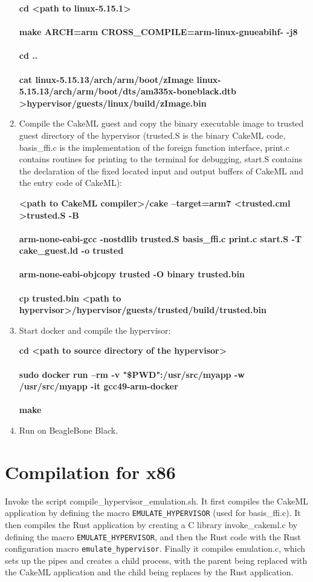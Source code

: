 \documentclass[11pt, a4paper]{article}
\begin{document}
\begin{enumerate}
		\textbf{cd \textless path to linux-5.15.1\textgreater}
\\\\
		\textbf{make ARCH=arm CROSS\_COMPILE=arm-linux-gnueabihf- -j8}
\\\\
		\textbf{cd ..}
\\\\
		\textbf{cat linux-5.15.13/arch/arm/boot/zImage linux-5.15.13/arch/arm/boot/dts/am335x-boneblack.dtb \textgreater hypervisor/guests/linux/build/zImage.bin}

\item
	Compile the CakeML guest and copy the binary executable image to trusted
	guest directory of the hypervisor (trusted.S is the binary CakeML code,
	basis\_ffi.c is the implementation of the foreign function interface, print.c
	contains routines for printing to the terminal for debugging, start.S
	contains the declaration of the fixed located input and output buffers of
	CakeML and the entry code of CakeML):

		\textbf{\textless path to CakeML compiler\textgreater/cake --target=arm7  <trusted.cml >trusted.S -B}
\\\\
		\textbf{arm-none-eabi-gcc -nostdlib trusted.S basis\_ffi.c print.c start.S -T cake\_guest.ld -o trusted}
\\\\
		\textbf{arm-none-eabi-objcopy trusted -O binary trusted.bin}
\\\\
		\textbf{cp trusted.bin \textless path to hypervisor\textgreater/hypervisor/guests/trusted/build/trusted.bin}
\item
	Start docker and compile the hypervisor:

		\textbf{cd \textless path to source directory of the hypervisor\textgreater}
\\\\
		\textbf{sudo docker run --rm -v "\$PWD":/usr/src/myapp -w /usr/src/myapp -it gcc49-arm-docker}
\\\\
		\textbf{make}
\item
	Run on BeagleBone Black.
\end{enumerate}

\section*{Compilation for x86}
Invoke the script compile\_hypervisor\_emulation.sh. It first compiles the CakeML
application by defining the macro \texttt{EMULATE\_HYPERVISOR} (used for basis\_ffi.c). It
then compiles the Rust application by creating a C library invoke\_cakeml.c by
defining the macro \texttt{EMULATE\_HYPERVISOR}, and then the Rust code with the Rust
configuration macro \texttt{emulate\_hypervisor}. Finally it compiles emulation.c, which
sets up the pipes and creates a child process, with the parent being replaced
with the CakeML application and the child being replaces by the Rust
application.
\end{document}
